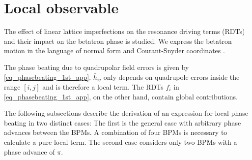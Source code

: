 %
%
%



\section{Local observable}
\label{sec:localobs}


The effect of linear
lattice imperfections on the resonance driving terms (RDTs) and their impact on the betatron phase is
studied.
We express the betatron motion in the language of normal form and Courant-Snyder coordinates
\cite{Bartolini1997}.

The phase beating due to quadrupolar field errors is given by \eqref{eq_phasebeating_1st_app}.
$\bar{h}_{ij}$ only depends on quadrupole errors inside the range $[i,j]$ and is therefore a local
term. The RDTs $f_i$ in \eqref{eq_phasebeating_1st_app}, on the other hand, contain global contributions.

The following subsections describe the derivation of an expression for local phase beating in two distinct
cases: The first is the general case with arbitrary phase advances between the BPMs. A combination of
four BPMs is necessary to calculate a pure local term. The second case considers only two BPMs with a
phase advance of $\pi$.

